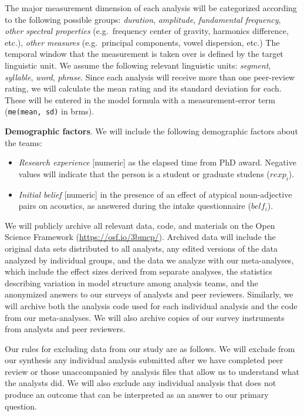 \documentclass[
  english,
  man,floatsintext]{apa6}
\providecommand{\tightlist}{%
  \setlength{\itemsep}{0pt}\setlength{\parskip}{0pt}}
\begin{document}
The major measurement dimension of each analysis will be categorized according to the following possible groups: \emph{duration}, \emph{amplitude}, \emph{fundamental frequency}, \emph{other spectral properties} (e.g.~frequency center of gravity, harmonics difference, etc.), \emph{other measures} (e.g.~principal components, vowel dispersion, etc.)
The temporal window that the measurement is taken over is defined by the target linguistic unit.
We assume the following relevant linguistic units: \emph{segment}, \emph{syllable}, \emph{word}, \emph{phrase}.
Since each analysis will receive more than one peer-review rating, we will calculate the mean rating and its standard deviation for each.
These will be entered in the model formula with a measurement-error term (\texttt{me(mean,\ sd)} in brms).

\textbf{Demographic factors}. We will include the following demographic factors about the teams:

\begin{itemize}
\tightlist
\item
  \emph{Research experience} {[}numeric{]} as the elapsed time from PhD award. Negative values will indicate that the person is a student or graduate studens (\(rexp_i\)).
\item
  \emph{Initial belief} {[}numeric{]} in the presence of an effect of atypical noun-adjective pairs on acoustics, as answered during the intake questionnaire (\(belf_i\)).
\end{itemize}

We will publicly archive all relevant data, code, and materials on the Open Science Framework (\url{https://osf.io/3bmcp/}).
Archived data will include the original data sets distributed to all analysts, any edited versions of the data analyzed by individual groups, and the data we analyze with our meta-analyses, which include the effect sizes derived from separate analyses, the statistics describing variation in model structure among analysis teams, and the anonymized answers to our surveys of analysts and peer reviewers.
Similarly, we will archive both the analysis code used for each individual analysis and the code from our meta-analyses.
We will also archive copies of our survey instruments from analysts and peer reviewers.

Our rules for excluding data from our study are as follows.
We will exclude from our synthesis any individual analysis submitted after we have completed peer review or those unaccompanied by analysis files that allow us to understand what the analysts did.
We will also exclude any individual analysis that does not produce an outcome that can be interpreted as an answer to our primary question.
\end{document}
